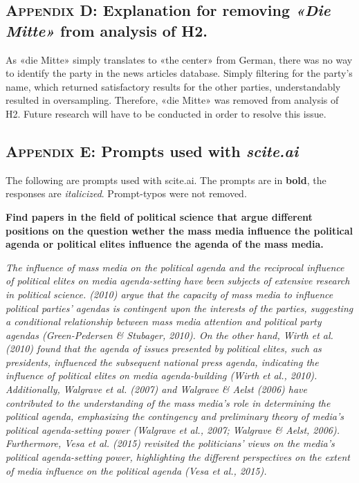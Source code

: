\documentclass[11pt,a4paper]{article}
\begin{document}
\newpage
\subsection*{\textsc{Appendix D}: Explanation for removing \textit{«Die Mitte»} from analysis of H2.}
As «die Mitte» simply translates to «the center» from German, there was no way to identify the party in the news articles database. Simply filtering for the party’s name, which returned satisfactory results for the other parties, understandably resulted in oversampling. Therefore, «die Mitte» was removed from analysis of H2. Future research will have to be conducted in order to resolve this issue.

\newpage
\subsection*{\textsc{Appendix E}: Prompts used with \textit{scite.ai}}
\setlength\parindent{0pt}

The following are prompts used with scite.ai. The prompts are in \textbf{bold}, the responses are \textit{italicized}. Prompt-typos were not removed.

\textbf{Find papers in the field of political science that argue different positions on the question wether the mass media influence the political agenda or political elites influence the agenda of the mass media.}

\textit{The influence of mass media on the political agenda and the reciprocal influence of political elites on media agenda-setting have been subjects of extensive research in political science. (2010) argue that the capacity of mass media to influence political parties' agendas is contingent upon the interests of the parties, suggesting a conditional relationship between mass media attention and political party agendas (Green-Pedersen \& Stubager, 2010). On the other hand, Wirth et al. (2010) found that the agenda of issues presented by political elites, such as presidents, influenced the subsequent national press agenda, indicating the influence of political elites on media agenda-building (Wirth et al., 2010). Additionally, Walgrave et al. (2007) and Walgrave \& Aelst (2006) have contributed to the understanding of the mass media's role in determining the political agenda, emphasizing the contingency and preliminary theory of media's political agenda-setting power (Walgrave et al., 2007; Walgrave \& Aelst, 2006). Furthermore, Vesa et al. (2015) revisited the politicians' views on the media's political agenda-setting power, highlighting the different perspectives on the extent of media influence on the political agenda (Vesa et al., 2015).}
\end{document}
